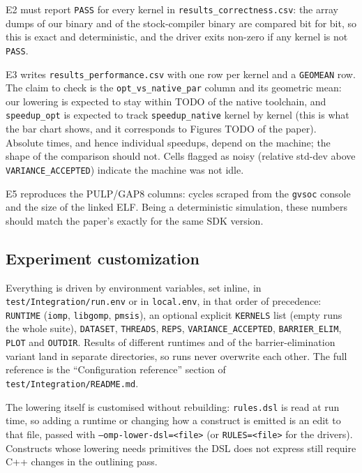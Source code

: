 E2 must report \texttt{PASS} for every kernel in
\texttt{results\_correctness.csv}: the array dumps of our binary and of the
stock-compiler binary are compared bit for bit, so this is exact and
deterministic, and the driver exits non-zero if any kernel is not \texttt{PASS}.

E3 writes \texttt{results\_performance.csv} with one row per kernel and a
\texttt{GEOMEAN} row.  The claim to check is the \texttt{opt\_vs\_native\_par}
column and its geometric mean: our lowering is expected to stay within TODO of
the native toolchain, and \texttt{speedup\_opt} is expected to track
\texttt{speedup\_native} kernel by kernel (this is what the bar chart shows,
and it corresponds to Figures TODO of the paper).  Absolute times, and hence
individual speedups, depend on the machine; the shape of the comparison should
not.  Cells flagged as noisy (relative std-dev above
\texttt{VARIANCE\_ACCEPTED}) indicate the machine was not idle.

E5 reproduces the PULP/GAP8 columns: cycles scraped from the \texttt{gvsoc}
console and the size of the linked ELF.  Being a deterministic simulation,
these numbers should match the paper's exactly for the same SDK version.

\subsection{Experiment customization}

Everything is driven by environment variables, set inline, in
\texttt{test/Integration/run.env} or in \texttt{local.env}, in that order of
precedence: \texttt{RUNTIME} (\texttt{iomp}, \texttt{libgomp},
\texttt{pmsis}), an optional explicit \texttt{KERNELS} list (empty runs the
whole suite), \texttt{DATASET}, \texttt{THREADS},
\texttt{REPS}, \texttt{VARIANCE\_ACCEPTED}, \texttt{BARRIER\_ELIM},
\texttt{PLOT} and \texttt{OUTDIR}.  Results of different runtimes and of the
barrier-elimination variant land in separate directories, so runs never
overwrite each other.  The full reference is the ``Configuration reference''
section of \texttt{test/Integration/README.md}.

The lowering itself is customised without rebuilding: \texttt{rules.dsl} is
read at run time, so adding a runtime or changing how a construct is emitted is
an edit to that file, passed with \texttt{--omp-lower-dsl=<file>} (or
\texttt{RULES=<file>} for the drivers).  Constructs whose lowering needs
primitives the DSL does not express still require C++ changes in the outlining
pass.

